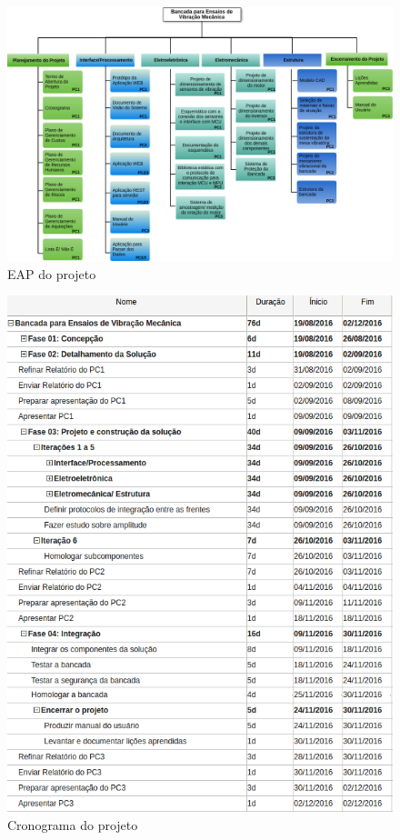 \begin{figure}[]
\centering
\includegraphics[keepaspectratio=true,scale=0.6,angle=90]{figuras/eap.png}
\caption{EAP do projeto}
\label{eap}
\end{figure}

\begin{figure}[H]
\centering
\includegraphics[scale=0.9]{figuras/cronograma_macro.png}
\caption{Cronograma do projeto}
\label{cronograma}
\end{figure}


